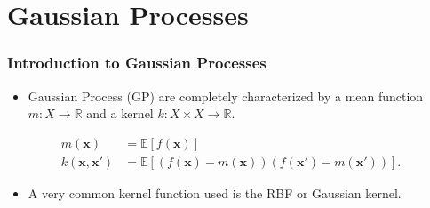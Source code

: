 \documentclass[9pt,hyperref={pdfpagelabels=false},xcolor=table]{beamer}
\begin{document}
\section{Gaussian Processes}

\begin{frame}
    \frametitle{Introduction to Gaussian Processes}
    \begin{itemize}
        \item Gaussian Process (GP) are completely characterized by a mean function $m : X \to \mathbb{R}$ and a kernel $k : X \times X \to \mathbb{R}$.
    \end{itemize}
    \begin{align*}
        m(\bm{x})           & = \mathbb{E} \left[ f(\bm{x}) \right]                                          \\
        k (\bm{x}, \bm{x'}) & = \mathbb{E} \left[ (f(\bm{x}) - m(\bm{x})) (f(\bm{x'}) - m(\bm{x'})) \right].
    \end{align*}
\end{frame}

\begin{frame}
    \begin{itemize}
        \item A very common kernel function used is the RBF or Gaussian kernel.
    \end{itemize}
    \vspace*{-\baselineskip}
    \vspace*{-\baselineskip}
    \begin{figure}[h]
        \centering
    \end{figure}
\end{frame}
\end{document}
